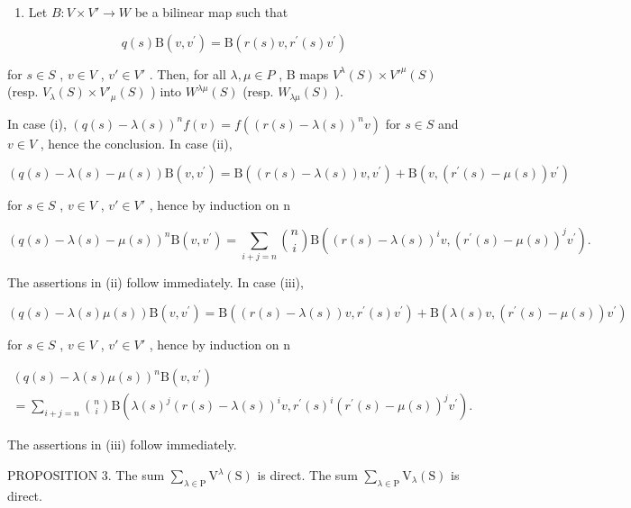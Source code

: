 \begin{enumerate}
\def\labelenumi{(\roman{enumi})}
\setcounter{enumi}{2}
\tightlist
\item
  Let \(B: V \times V' \to W\) be a bilinear map such that
\end{enumerate}

\[
q (s) \mathrm{B} (v, v ^ {\prime}) = \mathrm{B} (r (s) v, r ^ {\prime} (s) v ^ {\prime})
\]

for \(s \in S\) , \(v \in V\) , \(v' \in V'\) . Then, for all \(\lambda, \mu \in P\) , B maps \(V^{\lambda}(S) \times V'^{\mu}(S)\) (resp. \(V_{\lambda}(S) \times V'_{\mu}(S)\) ) into \(W^{\lambda\mu}(S)\) (resp. \(W_{\lambda\mu}(S)\) ).

In case (i), \((q(s) - \lambda(s))^n f(v) = f((r(s) - \lambda(s))^n v)\) for \(s \in S\) and \(v \in V\) , hence the conclusion. In case (ii),

\[
(q (s) - \lambda (s) - \mu (s)) \mathrm{B} (v, v ^ {\prime}) = \mathrm{B} ((r (s) - \lambda (s)) v, v ^ {\prime}) + \mathrm{B} (v, (r ^ {\prime} (s) - \mu (s)) v ^ {\prime})
\]

for \(s \in S\) , \(v \in V\) , \(v' \in V'\) , hence by induction on n

\[
(q (s) - \lambda (s) - \mu (s)) ^ {n} \mathrm{B} (v, v ^ {\prime}) = \sum_ {i + j = n} \binom {n} {i} \mathrm{B} ((r (s) - \lambda (s)) ^ {i} v, (r ^ {\prime} (s) - \mu (s)) ^ {j} v ^ {\prime}).
\]

The assertions in (ii) follow immediately. In case (iii),

\[
(q (s) - \lambda (s) \mu (s)) \mathrm{B} (v, v ^ {\prime}) = \mathrm{B} ((r (s) - \lambda (s)) v, r ^ {\prime} (s) v ^ {\prime}) + \mathrm{B} (\lambda (s) v, (r ^ {\prime} (s) - \mu (s)) v ^ {\prime})
\]

for \(s \in S\) , \(v \in V\) , \(v' \in V'\) , hence by induction on n

\[
\begin{array}{l} (q (s) - \lambda (s) \mu (s)) ^ {n} \mathrm{B} (v, v ^ {\prime}) \\ = \sum_ {i + j = n} \binom {n} {i} \mathrm{B} (\lambda (s) ^ {j} (r (s) - \lambda (s)) ^ {i} v, r ^ {\prime} (s) ^ {i} (r ^ {\prime} (s) - \mu (s)) ^ {j} v ^ {\prime}). \end{array}
\]

The assertions in (iii) follow immediately.

PROPOSITION 3. The sum \(\sum_{\lambda \in \mathrm{P}}\mathrm{V}^{\lambda}(\mathrm{S})\) is direct. The sum \(\sum_{\lambda \in \mathrm{P}}\mathrm{V}_{\lambda}(\mathrm{S})\) is direct.

